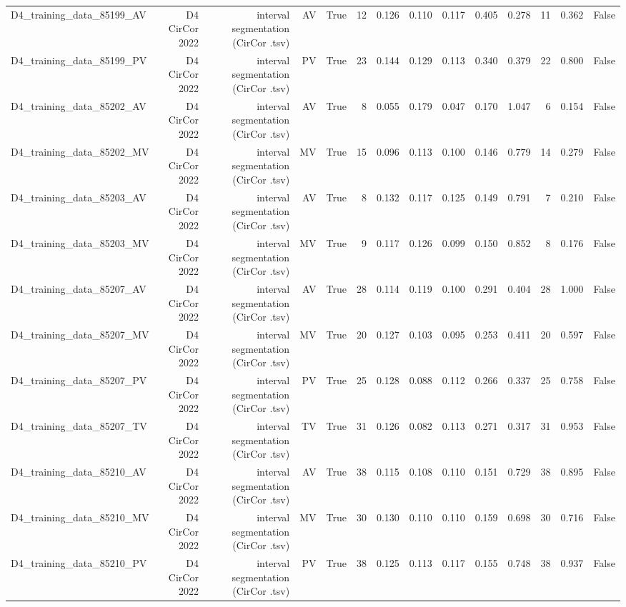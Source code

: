 \begin{table}[htbp]
\begin{tabular}{lrrrrrrrrrrrrr}
    D4\_training\_data\_85199\_AV & D4 CirCor 2022 & interval segmentation (CirCor .tsv) & AV & True & 12 & 0.126 & 0.110 & 0.117 & 0.405 & 0.278 & 11 & 0.362 & False \\
    D4\_training\_data\_85199\_PV & D4 CirCor 2022 & interval segmentation (CirCor .tsv) & PV & True & 23 & 0.144 & 0.129 & 0.113 & 0.340 & 0.379 & 22 & 0.800 & False \\
    D4\_training\_data\_85202\_AV & D4 CirCor 2022 & interval segmentation (CirCor .tsv) & AV & True & 8 & 0.055 & 0.179 & 0.047 & 0.170 & 1.047 & 6 & 0.154 & False \\
    D4\_training\_data\_85202\_MV & D4 CirCor 2022 & interval segmentation (CirCor .tsv) & MV & True & 15 & 0.096 & 0.113 & 0.100 & 0.146 & 0.779 & 14 & 0.279 & False \\
    D4\_training\_data\_85203\_AV & D4 CirCor 2022 & interval segmentation (CirCor .tsv) & AV & True & 8 & 0.132 & 0.117 & 0.125 & 0.149 & 0.791 & 7 & 0.210 & False \\
    D4\_training\_data\_85203\_MV & D4 CirCor 2022 & interval segmentation (CirCor .tsv) & MV & True & 9 & 0.117 & 0.126 & 0.099 & 0.150 & 0.852 & 8 & 0.176 & False \\
    D4\_training\_data\_85207\_AV & D4 CirCor 2022 & interval segmentation (CirCor .tsv) & AV & True & 28 & 0.114 & 0.119 & 0.100 & 0.291 & 0.404 & 28 & 1.000 & False \\
    D4\_training\_data\_85207\_MV & D4 CirCor 2022 & interval segmentation (CirCor .tsv) & MV & True & 20 & 0.127 & 0.103 & 0.095 & 0.253 & 0.411 & 20 & 0.597 & False \\
    D4\_training\_data\_85207\_PV & D4 CirCor 2022 & interval segmentation (CirCor .tsv) & PV & True & 25 & 0.128 & 0.088 & 0.112 & 0.266 & 0.337 & 25 & 0.758 & False \\
    D4\_training\_data\_85207\_TV & D4 CirCor 2022 & interval segmentation (CirCor .tsv) & TV & True & 31 & 0.126 & 0.082 & 0.113 & 0.271 & 0.317 & 31 & 0.953 & False \\
    D4\_training\_data\_85210\_AV & D4 CirCor 2022 & interval segmentation (CirCor .tsv) & AV & True & 38 & 0.115 & 0.108 & 0.110 & 0.151 & 0.729 & 38 & 0.895 & False \\
    D4\_training\_data\_85210\_MV & D4 CirCor 2022 & interval segmentation (CirCor .tsv) & MV & True & 30 & 0.130 & 0.110 & 0.110 & 0.159 & 0.698 & 30 & 0.716 & False \\
    D4\_training\_data\_85210\_PV & D4 CirCor 2022 & interval segmentation (CirCor .tsv) & PV & True & 38 & 0.125 & 0.113 & 0.117 & 0.155 & 0.748 & 38 & 0.937 & False \\

\end{tabular}
\end{table}
